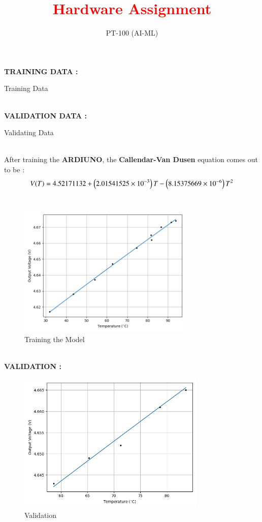 \documentclass[journal]{IEEEtran}
\begin{document}

\vspace{3cm}

\title{\textbf{\textcolor{red}{Hardware Assignment}}}

\author{PT-100 (AI-ML)}
\date{}


{\let\newpage\relax\maketitle}
\textbf{TRAINING DATA :}
\begin{table}[h]    	
    \centering
     
    \caption{Training Data}
    \label{tab:1-1.9-6}
\end{table}
\\
\textbf{VALIDATION DATA :}
\begin{table}[h]
	\centering
	
	\caption{Validating Data}
	\label{tab:2-1.9-7}
\end{table}
\\
After training the \textbf{ARDIUNO}, the \textbf{Callendar-Van Dusen} equation comes out to be : \\
\begin{align}
	V(T) = 4.52171132 + \left(2.01541525 \times 10^{-3}\right) T -\left(8.15375669 \times 10^{-6}\right) T^2
\end{align}
\\
\begin{figure}[h]
	\centering
	\includegraphics[width=0.75\textwidth]{figs/train.png}
    \caption{Training the Model}
    \label{fig:PT100}  
\end{figure}
\\
\newpage
\textbf{VALIDATION :}
\begin{figure}[ht]  
    \centering
    \includegraphics[width=0.8\textwidth]{figs/valid.png}  
    \caption{Validation}
    \label{fig:Valid}  
\end{figure}
\end{document}
